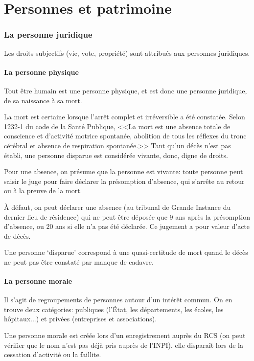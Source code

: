 \documentclass[10pt,a4paper]{article}
\begin{document}
\part{Personnes et patrimoine}

\section{La personne juridique}

Les droits subjectifs (vie, vote, propriété) sont attribués aux personnes juridiques.

\subsection{La personne physique}

Tout être humain est une personne physique, et est donc une personne juridique, de sa naissance à sa mort.

La mort est certaine lorsque l'arrêt complet et irréversible a été constatée. Selon 1232-1 du code de la Santé Publique, <<La mort est une absence totale de conscience et d'activité motrice spontanée, abolition de tous les réflexes du tronc cérébral et absence de respiration spontanée.>> Tant qu'un décès n'est pas établi, une personne disparue est considérée vivante, donc, digne de droits.

Pour une absence, on présume que la personne est vivante: toute personne peut saisir le juge pour faire déclarer la présomption d'absence, qui s'arrête au retour ou à la preuve de la mort.

À défaut, on peut déclarer une absence (au tribunal de Grande Instance du dernier lieu de résidence) qui ne peut être déposée que 9 ans après la présomption d'absence, ou 20 ans si elle n'a pas été déclarée. Ce jugement a pour valeur d'acte de décès.

Une personne `disparue' correspond à une quasi-certitude de mort quand le décès ne peut pas être constaté par manque de cadavre.

\subsection{La personne morale}

Il s'agit de regroupements de personnes autour d'un intérêt commun. On en trouve deux catégories: publiques (l'État, les départements, les écoles, les hôpitaux...) et privées (entreprises et associations).

Une personne morale est créée lors d'un enregistrement auprès du RCS (on peut vérifier que le nom n'est pas déjà pris auprès de l'INPI), elle disparaît lors de la cessation d'activité ou la faillite.
\end{document}
